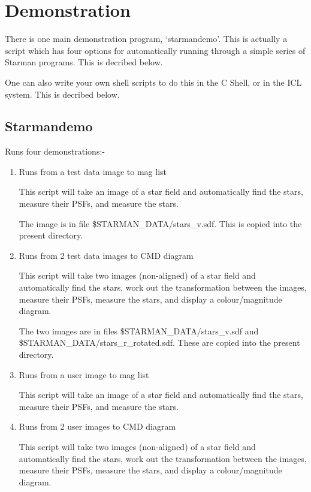 \newpage


\section{Demonstration}
\label{se:demo}


  There is one main demonstration program, `starmandemo'. This
  is actually a script which has four options for automatically
  running through a simple series of Starman programs. This is
  decribed below.

  One can also write your own shell scripts to do this in the
  C Shell, or in the ICL system. This is decribed below.

\subsection{Starmandemo}


  Runs four demonstrations:-

 \begin{enumerate}
 \item Runs from a test data image to mag list

  This script will take an image of a star field
  and automatically find the stars, measure their PSFs, and measure
  the stars.

 The image is in file \$STARMAN\_DATA/stars\_v.sdf. This is copied
  into the present directory.


 \item Runs from 2 test data images to CMD diagram

  This script will take two images (non-aligned) of a star field
  and automatically find the stars, work out the transformation
  between the images, measure their PSFs, measure the stars, and
  display a colour/magnitude diagram.

  The two images are in files \$STARMAN\_DATA/stars\_v.sdf  and
  \newline
   \$STARMAN\_DATA/stars\_r\_rotated.sdf. These are copied into
  the present directory.

 \item Runs from a user image to mag list

  This script will take an image of a star field
  and automatically find the stars, measure their PSFs, and measure
  the stars.

 \item Runs from 2 user images to CMD diagram

  This script will take two images (non-aligned) of a star field
  and automatically find the stars, work out the transformation
  between the images, measure their PSFs, measure the stars, and
  display a colour/magnitude diagram.


 \end{enumerate}


